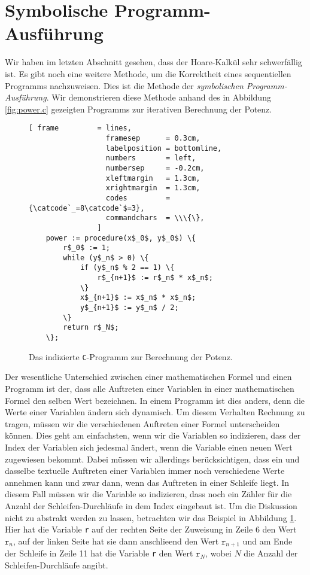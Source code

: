 \section{Symbolische Programm-Ausf\"uhrung}
Wir haben im letzten Abschnitt gesehen, dass der Hoare-Kalk\"ul sehr schwerf\"allig ist.  Es
gibt noch eine weitere Methode, um die Korrektheit eines sequentiellen Programms
nachzuweisen.  Dies ist die Methode der \emph{symbolischen Programm-Ausf\"uhrung}.  Wir
demonstrieren diese Methode anhand des in Abbildung \ref{fig:power.c} gezeigten
Programms zur iterativen Berechnung der Potenz.


\begin{figure}[!h]
\centering
\begin{Verbatim}[ frame         = lines, 
                  framesep      = 0.3cm, 
                  labelposition = bottomline,
                  numbers       = left,
                  numbersep     = -0.2cm,
                  xleftmargin   = 1.3cm,
                  xrightmargin  = 1.3cm,
                  codes         = {\catcode`_=8\catcode`$=3},
                  commandchars  = \\\{\},
                ]
    power := procedure(x$_0$, y$_0$) \{
        r$_0$ := 1;
        while (y$_n$ > 0) \{
            if (y$_n$ % 2 == 1) \{
                r$_{n+1}$ := r$_n$ * x$_n$;
            \} 
            x$_{n+1}$ := x$_n$ * x$_n$;
            y$_{n+1}$ := y$_n$ / 2;            
        \} 
        return r$_N$;
    \};
\end{Verbatim}
\vspace*{-0.3cm}
\caption{Das indizierte \texttt{C}-Programm zur Berechnung der Potenz.}
\label{fig:PowerIterative.iter}
\end{figure} %


Der wesentliche Unterschied zwischen einer mathematischen Formel und einen Programm ist
der, dass alle Auftreten einer Variablen in einer mathematischen Formel den selben Wert
bezeichnen.  In einem Programm ist dies anders, denn die Werte einer Variablen \"andern sich
dynamisch.  Um diesem  Verhalten Rechnung zu tragen, m\"ussen wir die verschiedenen
Auftreten einer Formel unterscheiden k\"onnen.  Dies geht am einfachsten, wenn wir die
Variablen so indizieren, dass der Index der Variablen sich jedesmal \"andert, wenn die
Variable einen neuen Wert zugewiesen bekommt. 
Dabei m\"ussen wir allerdings ber\"ucksichtigen, dass ein und dasselbe textuelle
Auftreten einer Variablen immer noch verschiedene Werte annehmen kann und zwar dann, wenn 
das Auftreten in einer Schleife liegt.  In diesem Fall m\"ussen wir die Variable so
indizieren, dass noch ein Z\"ahler f\"ur die Anzahl der Schleifen-Durchl\"aufe in dem Index
eingebaut ist.  Um die Diskussion nicht zu abstrakt werden zu lassen, betrachten wir das
Beispiel in Abbildung \ref{fig:PowerIterative.iter}.  Hier hat die Variable \texttt{r} auf
der rechten Seite der Zuweisung in Zeile 6 den Wert $\texttt{r}_n$, auf der linken Seite
hat sie dann anschlie\3end den Wert $\texttt{r}_{n+1}$ und am Ende der Schleife in Zeile 11 hat die
Variable \texttt{r} den Wert $\texttt{r}_N$, wobei $N$ die Anzahl der Schleifen-Durchl\"aufe
angibt.

